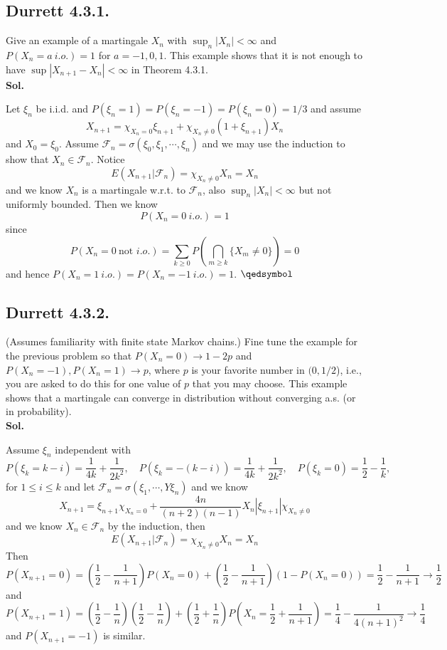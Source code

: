 \documentclass[lang=en,11pt,a4paper,citestyle =authoryear]{elegantpaper}
\newcommand{\prvd}{$\hfill \qedsymbol$}
\newcommand{\F}{\mathcal{F}}
\begin{document}
\subsection*{Durrett 4.3.1.} 
Give an example of a martingale $X_n$ with $\sup_n |X_n| < \infty$ and $P(X_n = a\ i.o.) = 1$ for $a = -1,0,1$. This example shows that it is not enough to have $\sup |X_{n+1} - X_n| < \infty$ in Theorem 4.3.1.
\vspace{0.5em}\\
\textbf{Sol.} \par
Let $\xi_n$ be i.i.d. and $P(\xi_n = 1) = P(\xi_n = -1) = P(\xi_n = 0) = 1/3$ and assume
\[
X_{n+1} = \chi_{X_n = 0}\xi_{n+1} + \chi_{X_n \neq 0}(1+\xi_{n+1})X_n
\]
and $X_0 = \xi_0$. Assume $\F_n = \sigma(\xi_0,\xi_1,\cdots,\xi_n)$ and we may use the induction to show that $X_n \in \F_n$. Notice
\[
E(X_{n+1}|\F_n) = \chi_{X_n\neq 0} X_n = X_n
\]
and we know $X_n$ is a martingale w.r.t. to $\F_n$, also $\sup_n|X_n| < \infty$ but not uniformly bounded. Then we know
\[P(X_n = 0\ i.o.) = 1\] since
\[
P(X_n = 0\ \text{not }i.o.) = \sum\limits_{k\geq 0} P(\bigcap_{m\geq k}\{X_m \neq 0\}) = 0
\]
and hence $P(X_n = 1\ i.o.) = P(X_n = -1\ i.o.) = 1$.
\prvd
\vspace{0.5em}

\subsection*{Durrett 4.3.2.} 
(Assumes familiarity with finite state Markov chains.) Fine tune the example for the previous problem so that $P (X_n = 0) \to 1 - 2p$ and $P(X_n = -1), P(X_n = 1) \to p$, where $p$ is your favorite number in $(0,1/2$), i.e., you are asked to do this for one value of $p$ that you may choose. This example shows that a martingale can converge in distribution without converging a.s. (or in probability).
\vspace{0.5em}\\
\textbf{Sol.} \par
Assume $\xi_n$ independent with
\[
P(\xi_k = k-i) = \dfrac{1}{4k}+\dfrac{1}{2k^2},\quad P(\xi_k = -(k-i)) =  \dfrac{1}{4k}+\dfrac{1}{2k^2},\quad P(\xi_k = 0) = \dfrac{1}{2} - \dfrac{1}{k}, 
\]
for $1\leq i \leq k$ and let $\F_n = \sigma(\xi_1,\cdots,Y\xi_n)$ and we know
\[
X_{n+1} = \xi_{n+1}\chi_{X_n = 0} + \dfrac{4n}{(n+2)(n-1)}X_n|\xi_{n+1}|\chi_{X_{n}\neq 0}
\]
and we know $X_n \in \F_n$ by the induction, then
\[
E(X_{n+1}|\F_n) = \chi_{X_n\neq 0}X_n = X_n
\]
Then \[P(X_{n+1} = 0) = (\dfrac{1}{2}-\dfrac{1}{n+1})P(X_n = 0) + (\dfrac{1}{2}-\dfrac{1}{n+1})(1-P(X_n = 0)) = \dfrac{1}{2}-\dfrac{1}{n+1} \to \dfrac{1}{2}\] and
\[
P(X_{n+1} = 1) = (\dfrac{1}{2}-\dfrac{1}{n})(\dfrac{1}{2} - \dfrac{1}{n})+(\dfrac{1}{2}+\dfrac{1}{n})P(X_n = \dfrac{1}{2}+\dfrac{1}{n+1}) = \dfrac{1}{4}- \dfrac{1}{4(n+1)^2} \to \dfrac{1}{4}
\]
and $P(X_{n+1} = -1)$ is similar.
\end{document}
